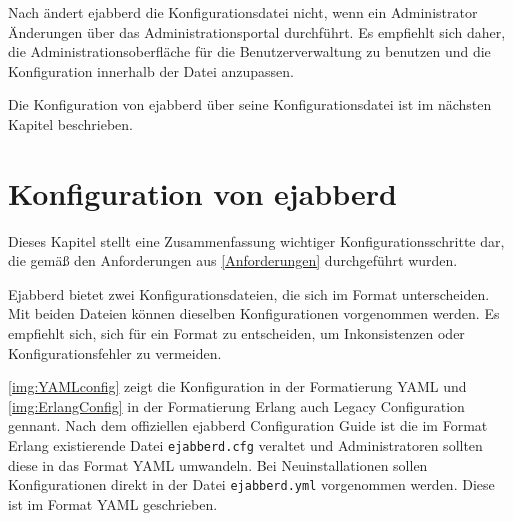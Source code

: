 \documentclass[a4paper,titlepage,halfparskip,12pt]{scrreprt}
\begin{document}
\begin{onehalfspacing}
Nach \cite{ejabberdDoc} ändert ejabberd die Konfigurationsdatei nicht, wenn ein Administrator Änderungen über das Administrationsportal durchführt. Es empfiehlt sich daher, die Administrationsoberfläche für die Benutzerverwaltung zu benutzen und die Konfiguration innerhalb der Datei anzupassen.

Die Konfiguration von ejabberd über seine Konfigurationsdatei ist im nächsten Kapitel beschrieben.


\section{Konfiguration von ejabberd}
\label{sec:Konfiguration}

Dieses Kapitel stellt eine Zusammenfassung wichtiger Konfigurationsschritte dar, die gemäß den Anforderungen aus \autoref{Anforderungen} durchgeführt wurden.

Ejabberd bietet zwei Konfigurationsdateien, die sich im Format unterscheiden. Mit beiden Dateien können dieselben Konfigurationen vorgenommen werden. Es empfiehlt sich, sich für ein Format zu entscheiden, um Inkonsistenzen oder Konfigurationsfehler zu vermeiden.

\autoref{img:YAMLconfig} zeigt die Konfiguration in der Formatierung \ac{YAML} und \autoref{img:ErlangConfig} in der Formatierung Erlang auch Legacy Configuration gennant. Nach dem offiziellen ejabberd Configuration Guide \cite{ejabberdDoc} ist die im Format Erlang existierende Datei \texttt{ejabberd.cfg} veraltet und Administratoren sollten diese in das Format \ac{YAML} umwandeln. Bei Neuinstallationen sollen Konfigurationen direkt in der Datei \texttt{ejabberd.yml} vorgenommen werden. Diese ist im Format \ac{YAML} geschrieben.


\end{onehalfspacing}
\end{document}
